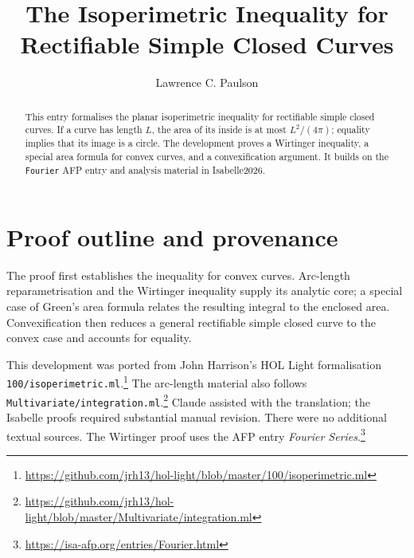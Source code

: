\documentclass[11pt,a4paper]{article}
\begin{document}
\title{The Isoperimetric Inequality for Rectifiable Simple Closed Curves}
\author{Lawrence C. Paulson}
\date{}
\maketitle

\begin{abstract}
This entry formalises the planar isoperimetric inequality for rectifiable
simple closed curves. If a curve has length $L$, the area of its inside is
at most $L^2/(4\pi)$; equality implies that its image is a circle. The
development proves a Wirtinger inequality, a special area formula for
convex curves, and a convexification argument. It builds on the
\texttt{Fourier} AFP entry and analysis material in Isabelle2026.
\end{abstract}

\tableofcontents

\section{Proof outline and provenance}

The proof first establishes the inequality for convex curves. Arc-length
reparametrisation and the Wirtinger inequality supply its analytic core;
a special case of Green's area formula relates the resulting integral to
the enclosed area. Convexification then reduces a general rectifiable
simple closed curve to the convex case and accounts for equality.

This development was ported from John Harrison's HOL Light formalisation
\texttt{100/isoperimetric.ml}.\footnote{\url{https://github.com/jrh13/hol-light/blob/master/100/isoperimetric.ml}}
The arc-length material also follows
\texttt{Multivariate/integration.ml}.\footnote{\url{https://github.com/jrh13/hol-light/blob/master/Multivariate/integration.ml}}
Claude assisted with the translation; the Isabelle proofs required
substantial manual revision. There were no additional textual sources.
The Wirtinger proof uses the AFP entry
\emph{Fourier Series}.\footnote{\url{https://isa-afp.org/entries/Fourier.html}}


\end{document}
